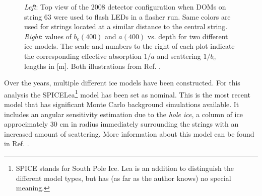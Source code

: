 \begin{figure}[ht]
\begin{minipage}{6in}
  \centering
  \hspace*{.7in}
\end{minipage}
\caption{\textit{Left}: Top view of the 2008 detector configuration when DOMs on string 63 were used to flash LEDs in a flasher run. Same colors are used for strings located at a similar distance to the central string. \textit{Right}: values of $b_{e}(400)$ and $a(400)$ vs. depth for two different ice models. The scale and numbers to the right of each plot indicate the corresponding effective  absorption $1/a$ and scattering $1/b_e$ lengths in [m]. Both illustrations from Ref. \cite{1412998}.}
%
\label{fig:2008config}
\end{figure}

Over the years, multiple different ice models have been constructed. For this analysis the SPICELea\footnote{SPICE stands for South Pole Ice. Lea is an addition to distinguish the different model types, but has (as far as the author knows) no special meaning.} model has been set as nominal. This is the most recent model that has significant Monte Carlo background simulations available. It includes an angular sensitivity estimation due to the \textit{hole ice}, a column of ice approcimately 30 cm in radius immediately surrounding the strings with an increased amount of scattering. More information about this model can be found in Ref. \cite{1412998}.
